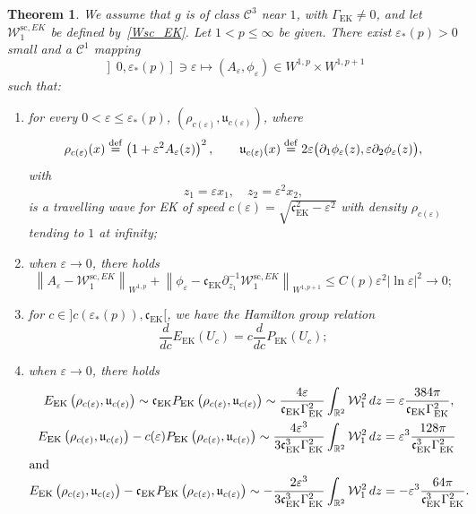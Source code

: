 \documentclass[10pt]{amsart}
\newtheorem{theo}{Theorem}[section]
\theoremstyle{definition}\newtheorem{defi}[theo]{Definition}\newtheorem{rema}[theo]{Remark}\newtheorem{exam}[theo]{Example}\newtheorem{exem}[theo]{Example}\newtheorem{nota}[theo]{Notation}
\newcommand*\p{\partial}
\newcommand*\R{\mathbb R}
\newcommand*\ddef{\stackrel{\rm def}{=}}
\renewcommand{\sc}{\mathrm{sc}}
\newcommand{\EK}{\mathrm{EK}}
\newcommand*\BC{\mathcal{C}}
\newcommand*\BW{\mathcal{W}}
\newcommand*\cs{{\mathfrak c}}
\renewcommand*\u{\mathfrak{u}}
\newcommand*\ii{\infty}
\newcommand*\ls{\leqslant }
\newcommand*\e{\varepsilon}
\newcommand*\lne{\lvert \ln \varepsilon \rvert}
\newcommand*{\romanenumi}{\renewcommand*{\theenumi}{\roman{enumi}}}
\begin{document}
\begin{theo}\label{mainTH_EK}
We assume that $g$ is of class $ \BC^3 $ near $1 $, with $ \Gamma_{\EK} \neq 0 $, and let $ \BW_1^{\sc, EK} $ be defined by~\eqref{Wsc_EK}. Let $ 1 < p \ls \ii $ be given. There exist $ \e_* (p) > 0 $ small and a $ \BC^1 $ mapping
\[
\left] 0, \e_*(p)\right] \ni \e \mapsto (A_\e, \phi_\e) \in W^{1,p} \times W^{1,p+1}
\]
such that:
\begin{enumerate}\romanenumi
\item\label{theo.18.1} for every $ 0 < \e \ls \e_*(p) $, $ (\rho_{c(\e)}, \u_{c(\e)}) $, where
\[
\rho_{c(\e)} (x) \ddef \left(1 + \e^2 A_\e (z) \right)^2,
\qquad 
\u_{c(\e)} (x) \ddef 2 \e \big(\p_1 \phi_\e (z), \e \p_2 \phi_\e (z) \big),
\]
with
\[
z_1 = \e x_1, \quad z_2 = \e^2 x_2,
\]
is a travelling wave for EK of speed $ c(\e) = \sqrt{ \cs_{\EK}^2 - \e^2 } $ with density $ \rho_{c(\e)} $ tending to $1$ at infinity;

\item\label{theo.18.2} when $ \e \to 0 $, there holds
\[
\left\| A_\e - \BW_1^{\sc, EK} \right\|_{ W^{1,p} } + \left\| \phi_\e - \cs_{\EK} \p_{z_1}^{-1} \BW_1^{\sc,EK} \right\|_{W^{1,p+1} }
\ls C (p) \e^2 \lne^2 \to 0 ;
\]
\item\label{theo.18.3} for $ c \in] c(\e_*(p)), \cs_{\EK} [$, we have the Hamilton group relation
\[
\frac{d}{dc} E_{\EK} (U_c) = c \frac{d}{dc} P_{\EK}(U_c) ;
\]
\item\label{theo.18.4} when $ \e \to 0 $, there holds
\begin{align*}
E_{\EK} \left(\rho_{c(\e)}, \u_{c(\e)}\right)
\sim \cs_{\EK} P_{\EK} \left(\rho_{c(\e)}, \u_{c(\e)}\right)
\sim \frac{ 4 \e}{\cs_{\EK} \Gamma_{\EK}^2} \int_{\R^2} \BW_1^2 \, dz &= \e \frac{384 \pi}{\cs_{\EK} \Gamma_{\EK}^2},
\\
E_{\EK}\left(\rho_{c(\e)}, \u_{c(\e)}\right) - c(\e) P_{\EK} \left(\rho_{c(\e)}, \u_{c(\e)}\right)
\sim \frac{4 \e^3}{3 \cs_{\EK}^3 \Gamma_{\EK}^2} \int_{\R^2} \BW_1^2 \, dz &= \e^3 \frac{128\pi}{\cs_{\EK}^3 \Gamma_{\EK}^2}
\\
\intertext{and}
E_{\EK}\left(\rho_{c(\e)}, \u_{c(\e)}\right) - \cs_{\EK} P_{\EK} \left(\rho_{c(\e)}, \u_{c(\e)}\right)
\sim - \frac{2 \e^3}{3\cs_{\EK}^3 \Gamma_{\EK}^2} \int_{\R^2} \BW_1^2 \, dz &= - \e^3 \frac{64 \pi}{\cs_{\EK}^3 \Gamma_{\EK}^2}.
\end{align*}
\end{enumerate}
\end{theo}
\end{document}
